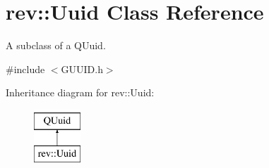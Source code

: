 \hypertarget{classrev_1_1_uuid}{}\section{rev\+::Uuid Class Reference}
\label{classrev_1_1_uuid}


A subclass of a Q\+Uuid.  




{\ttfamily \#include $<$G\+U\+U\+I\+D.\+h$>$}

Inheritance diagram for rev\+::Uuid\+:\begin{figure}[H]
\begin{center}
\leavevmode
\includegraphics[height=2.000000cm]{classrev_1_1_uuid}
\end{center}
\end{figure}

